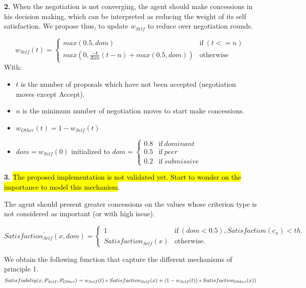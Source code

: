 \documentclass{article}
\begin{document}
	\textbf{2.} When the negotiation is not converging, the agent should make concessions in his decision making, which can be interpreted as reducing the weight of its self satisfaction. We propose thus, to update $ w_{Self}$ to reduce over negotiation rounds. 
	
	
		$$w_{Self} (t) = \left\{\begin{array}{ll}
		max(0.5,dom) & \mathrm{if\ }(t<=n)\\
		max(0, \frac{-k}{dom} (t-n)+ max(0.5,dom)) & \mathrm{otherwise}
		\end{array}\right.$$ With: 
		\begin{itemize}
			\item $t$ is the number of proposals which have not been accepted (negotiation moves except Accept).
			\item $n$ is the minimum number of negotiation moves to start make concessions.
			\item $w_{Other} (t) = 1 - w_{Self} (t)$ 
			\item $dom = w_{Self} (0)$ initialized to  
					$dom = \left\{\begin{array}{ll}
					0.8 & \mathrm{if\ } dominant \\
					0.5 & \mathrm{if\ } peer \\
					0.2 & \mathrm{if\ } submissive 
					\end{array}\right.$
		 \end{itemize}
	
	
	
	\textbf{3. } \hl{The proposed implementation is not validated yet. Start to wonder on the importance to model this mechanism}.
	
	The agent should present greater concessions on the values whose criterion type is not considered as important (or with high issue).
	
	$$Satisfaction^{'}_{Self} (x,dom) = \left\{\begin{array}{ll}
	1 & \mathrm{if\ }(dom<0.5) , Satisfaction(c_x) < th.\\
	Satisfaction_{Self}(x) & \mathrm{otherwise}.
	\end{array}\right.$$
	
	We obtain the following function that capture the different mechanisms of principle 1. 
	\begin{dmath}
	$$Satisfiabiliy(x,P_{Self},P_{Other}) = w_{Self}(t) * Satisfaction_{Self}(x) + (1 - w_{Self}(t)) * Satisfaction_{Other}(x))$$
	\end{dmath}
	
\end{document}
